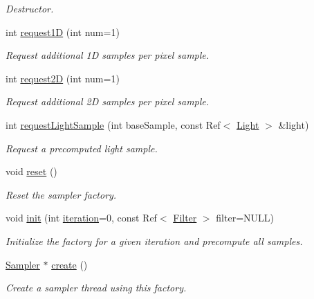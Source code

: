 \begin{DoxyCompactItemize}
\begin{DoxyCompactList}\small\item\em Destructor. \item\end{DoxyCompactList}\item 
int \hyperlink{classembree_1_1_sampler_factory_a6df8c9759f177de7f30281bc0f7bf71f}{request1D} (int num=1)
\begin{DoxyCompactList}\small\item\em Request additional 1D samples per pixel sample. \item\end{DoxyCompactList}\item 
int \hyperlink{classembree_1_1_sampler_factory_a15ef0f4615991aa17ae5cdd040664b00}{request2D} (int num=1)
\begin{DoxyCompactList}\small\item\em Request additional 2D samples per pixel sample. \item\end{DoxyCompactList}\item 
int \hyperlink{classembree_1_1_sampler_factory_a948dfe9e10ff52ed99763bcfba0662a0}{requestLightSample} (int baseSample, const Ref$<$ \hyperlink{classembree_1_1_light}{Light} $>$ \&light)
\begin{DoxyCompactList}\small\item\em Request a precomputed light sample. \item\end{DoxyCompactList}\item 
void \hyperlink{classembree_1_1_sampler_factory_aa2291a199a2e115a92ca459ec12781c9}{reset} ()
\begin{DoxyCompactList}\small\item\em Reset the sampler factory. \item\end{DoxyCompactList}\item 
void \hyperlink{classembree_1_1_sampler_factory_a6799c6652ba0986ed31d8ab284637a1c}{init} (int \hyperlink{classembree_1_1_sampler_factory_a27184a51d0d3e9a6268ed5d8cc887cb3}{iteration}=0, const Ref$<$ \hyperlink{classembree_1_1_filter}{Filter} $>$ filter=NULL)
\begin{DoxyCompactList}\small\item\em Initialize the factory for a given iteration and precompute all samples. \item\end{DoxyCompactList}\item 
\hyperlink{classembree_1_1_sampler}{Sampler} $\ast$ \hyperlink{classembree_1_1_sampler_factory_a474de6115bef03008c3d3047569a2c19}{create} ()
\begin{DoxyCompactList}\small\item\em Create a sampler thread using this factory. \item\end{DoxyCompactList}\end{DoxyCompactItemize}
